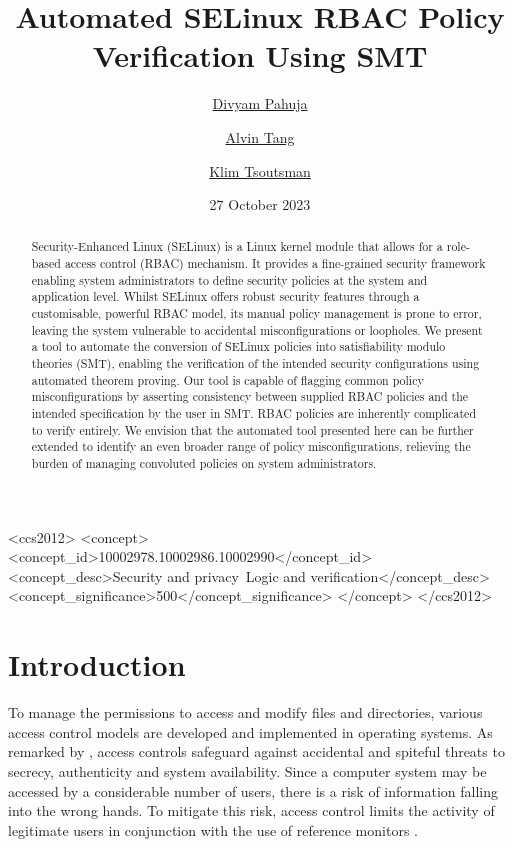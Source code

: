 \documentclass[acmsmall,screen,nonacm]{acmart}
\title{Automated SELinux RBAC Policy Verification Using SMT}
\author{\href{mailto:divyam.pahuja@anu.edu.au}{Divyam Pahuja}}
\affiliation{%
    \institution{The Australian National University}
    \city{Canberra}
    \country{Australia}}
\author{\href{mailto:u7447218@anu.edu.au}{Alvin Tang}}
\affiliation{%
    \institution{The Australian National University}
    \city{Canberra}
    \country{Australia}}
\author{\href{mailto:u7655549@anu.edu.au}{Klim Tsoutsman}}
\affiliation{%
    \institution{The Australian National University}
    \city{Canberra}
    \country{Australia}}
\date{27 October 2023}
\begin{document}
\begin{abstract}
Security-Enhanced Linux (SELinux) is a Linux kernel module that allows for a 
role-based access control (RBAC) mechanism. It provides a fine-grained security 
framework enabling system administrators to define security policies at the 
system and application level. Whilst SELinux offers robust security features 
through a customisable, powerful RBAC model, its manual policy management is 
prone to error, leaving the system vulnerable to accidental misconfigurations 
or loopholes. We present a tool to automate the conversion of SELinux policies 
into satisfiability modulo theories (SMT), enabling the verification of the 
intended security configurations using automated theorem proving. Our tool is 
capable of flagging common policy misconfigurations by asserting consistency 
between supplied RBAC policies and the intended specification by the user in 
SMT. RBAC policies are inherently complicated to verify entirely. We envision 
that the automated tool presented here can be further extended to identify an 
even broader range of policy misconfigurations,  relieving the burden of 
managing convoluted policies on system administrators.
\end{abstract}

\begin{CCSXML}
<ccs2012>
<concept>
<concept_id>10002978.10002986.10002990</concept_id>
<concept_desc>Security and privacy~Logic and verification</concept_desc>
<concept_significance>500</concept_significance>
</concept>
</ccs2012>
\end{CCSXML}


\maketitle

\section{Introduction}

To manage the permissions to access and modify files and directories, various 
access control models are developed and implemented in operating systems. As 
remarked by \citet{crypto}, access controls safeguard against accidental and 
spiteful threats to secrecy, authenticity and system availability. Since a 
computer system may be accessed by a considerable number of users, there is a 
risk of information falling into the wrong hands. To mitigate this risk, access 
control limits the activity of legitimate users in conjunction with the use of 
reference monitors \cite{principles}.
\end{document}
